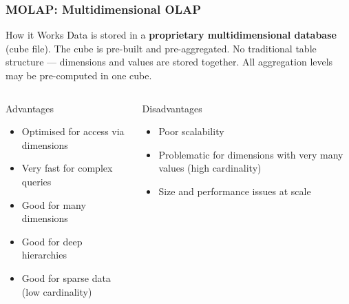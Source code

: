 \begin{frame}
  \frametitle{MOLAP: Multidimensional OLAP}

  \begin{block}{How it Works}
    Data is stored in a \textbf{proprietary multidimensional database} (cube file).
    The cube is pre-built and pre-aggregated.
    No traditional table structure --- dimensions and values are stored together.
    All aggregation levels may be pre-computed in one cube.
  \end{block}

  \begin{columns}[T]
    \begin{block}{Advantages}
      \begin{itemize}
        \item Optimised for access via dimensions
        \item Very fast for complex queries
        \item Good for many dimensions
        \item Good for deep hierarchies
        \item Good for sparse data (low cardinality)
      \end{itemize}
    \end{block}

    \begin{alertblock}{Disadvantages}
      \begin{itemize}
        \item Poor scalability
        \item Problematic for dimensions with very many values (high cardinality)
        \item Size and performance issues at scale
      \end{itemize}
    \end{alertblock}
  \end{columns}
\end{frame}


